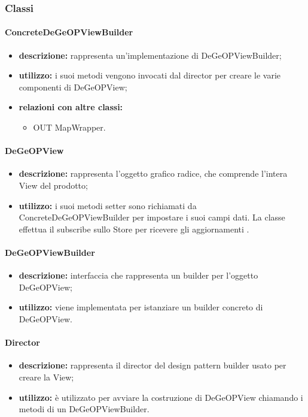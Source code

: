 \subsubsection{Classi}
\paragraph{ConcreteDeGeOPViewBuilder}
\begin{itemize}
	\item \textbf{descrizione:} rappresenta un'implementazione di DeGeOPViewBuilder;
	\item \textbf{utilizzo:} i suoi metodi vengono invocati dal director per creare le varie componenti di DeGeOPView;
	\item \textbf{relazioni con altre classi:} 
	\begin{itemize}
		\item OUT MapWrapper.
	\end{itemize}
\end{itemize}
\paragraph{DeGeOPView}
\begin{itemize}
	\item \textbf{descrizione:} rappresenta l'oggetto grafico radice, che comprende l'intera View del prodotto;
	\item \textbf{utilizzo:} i suoi metodi setter sono richiamati da ConcreteDeGeOPViewBuilder per impostare i suoi campi dati. La classe effettua il subscribe sullo Store per ricevere gli aggiornamenti .
\end{itemize}
\paragraph{DeGeOPViewBuilder}
\begin{itemize}
	\item \textbf{descrizione:} interfaccia che rappresenta un builder per l'oggetto DeGeOPView;
	\item \textbf{utilizzo:} viene implementata per istanziare un builder concreto di DeGeOPView.
\end{itemize}
\paragraph{Director}
\begin{itemize}
	\item \textbf{descrizione:} rappresenta il director del design pattern builder usato per creare la View;
	\item \textbf{utilizzo:} è utilizzato per avviare la costruzione di DeGeOPView chiamando i metodi di un DeGeOPViewBuilder.
\end{itemize}
\newpage
